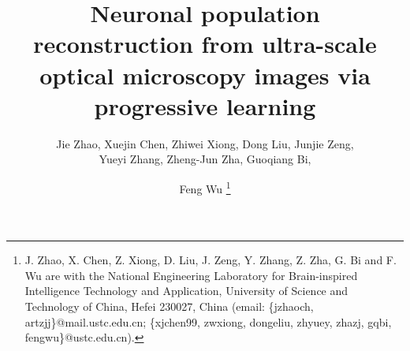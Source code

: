 \documentclass[journal]{IEEEtran}
\begin{document}
%
\title{Neuronal population reconstruction from ultra-scale optical microscopy images via progressive learning}
% 
%
%
\author{Jie Zhao, Xuejin Chen, Zhiwei Xiong, Dong Liu, Junjie Zeng, \\Yueyi Zhang, Zheng-Jun Zha, Guoqiang Bi, \and Feng Wu
\thanks{J. Zhao, X. Chen, Z. Xiong, D. Liu, J. Zeng, Y. Zhang, Z. Zha, G. Bi and F. Wu are with the National Engineering Laboratory for Brain-inspired Intelligence Technology and Application, University of Science and Technology of China, Hefei 230027, China (email: \{jzhaoch, artzjj\}@mail.ustc.edu.cn; \{xjchen99, zwxiong, dongeliu, zhyuey, zhazj, gqbi, fengwu\}@ustc.edu.cn).}
}
\end{document}
